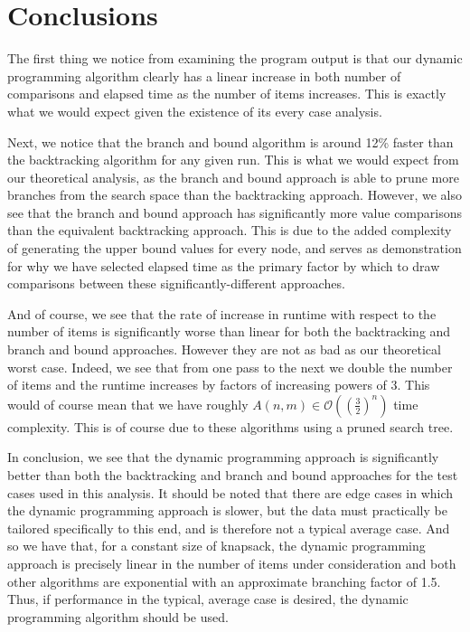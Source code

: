 \documentclass{article}
\begin{document}
\section{Conclusions}

The first thing we notice from examining the program output is that our dynamic programming algorithm clearly has a linear increase in both number of comparisons and elapsed time as the number of items increases.
This is exactly what we would expect given the existence of its every case analysis.

Next, we notice that the branch and bound algorithm is around 12\% faster than the backtracking algorithm for any given run.
This is what we would expect from our theoretical analysis, as the branch and bound approach is able to prune more branches from the search space than the backtracking approach.
However, we also see that the branch and bound approach has significantly more value comparisons than the equivalent backtracking approach.
This is due to the added complexity of generating the upper bound values for every node, and serves as demonstration for why we have selected elapsed time as the primary factor by which to draw comparisons between these significantly-different approaches.

And of course, we see that the rate of increase in runtime with respect to the number of items is significantly worse than linear for both the backtracking and branch and bound approaches.
However they are not as bad as our theoretical worst case.
Indeed, we see that from one pass to the next we double the number of items and the runtime increases by factors of increasing powers of 3.
This would of course mean that we have roughly $A(n,m) \in \mathcal{O}((\frac{3}{2})^n)$ time complexity.
This is of course due to these algorithms using a pruned search tree.

In conclusion, we see that the dynamic programming approach is significantly better than both the backtracking and branch and bound approaches for the test cases used in this analysis.
It should be noted that there are edge cases in which the dynamic programming approach is slower, but the data must practically be tailored specifically to this end, and is therefore not a typical average case.
And so we have that, for a constant size of knapsack, the dynamic programming approach is precisely linear in the number of items under consideration and both other algorithms are exponential with an approximate branching factor of 1.5.
Thus, if performance in the typical, average case is desired, the dynamic programming algorithm should be used.
\end{document}
